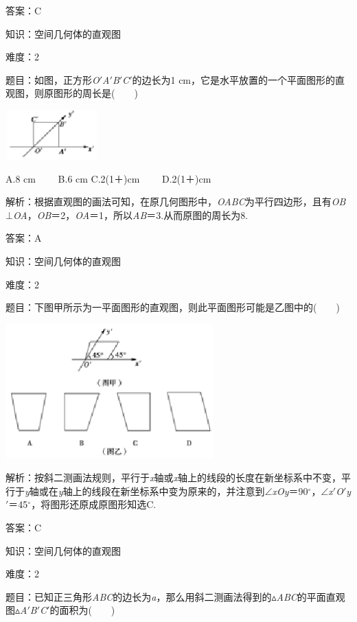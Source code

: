 \documentclass{article} %
\begin{document}
答案：C

知识：空间几何体的直观图

难度：2

题目：如图，正方形\textit{O}$'$\textit{A}$'$\textit{B}$'$\textit{C}$'$的边长为1 cm，它是水平放置的一个平面图形的直观图，则原图形的周长是(　　)

\includegraphics*[width=1.40in, height=0.75in, keepaspectratio=false]{image54}

A.8 cm　　 B.6 cm C.2(1＋)cm　　 D.2(1＋)cm

解析：根据直观图的画法可知，在原几何图形中，\textit{OABC}为平行四边形，且有\textit{OB}$\mathrm{\bot}$\textit{OA}，\textit{OB}＝2，\textit{OA}＝1，所以\textit{AB}＝3.从而原图的周长为8.

答案：A

知识：空间几何体的直观图

难度：2

题目：下图甲所示为一平面图形的直观图，则此平面图形可能是乙图中的(　　)

\includegraphics*[width=3.15in, height=2.04in, keepaspectratio=false]{image55}

解析：按斜二测画法规则，平行于\textit{x}轴或\textit{x}轴上的线段的长度在新坐标系中不变，平行于\textit{y}轴或在\textit{y}轴上的线段在新坐标系中变为原来的，并注意到$\mathrm{\angle}$\textit{xOy}＝90$\mathrm{{}^\circ}$，$\mathrm{\angle}$\textit{x}$'$\textit{O}$'$\textit{y}$'$＝45$\mathrm{{}^\circ}$，将图形还原成原图形知选C.

答案：C

知识：空间几何体的直观图

难度：2

题目：已知正三角形\textit{ABC}的边长为\textit{a}，那么用斜二测画法得到的$\mathrm{\vartriangle}$\textit{ABC}的平面直观图$\mathrm{\vartriangle}$\textit{A}$'$\textit{B}$'$\textit{C}$'$的面积为(　　)
\end{document}
